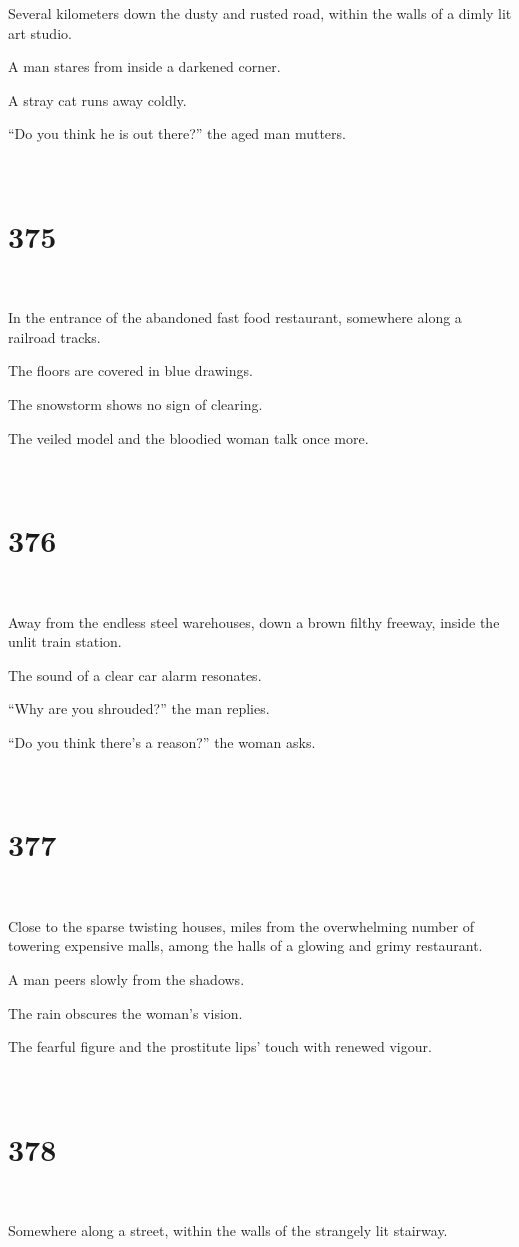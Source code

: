\documentclass{report}
\begin{document}
Several kilometers down the dusty and rusted road, within the walls of a dimly lit art studio.

A man stares from inside a darkened corner.

A stray cat runs away coldly.

``Do you think he is out there?'' the aged man mutters.

~
\chapter*{375}
~

In the entrance of the abandoned fast food restaurant, somewhere along a railroad tracks.

The floors are covered in blue drawings.

The snowstorm shows no sign of clearing.

The veiled model and the bloodied woman talk once more.

~
\chapter*{376}
~

Away from the endless steel warehouses, down a brown filthy freeway, inside the unlit train station.

The sound of a clear car alarm resonates.

``Why are you shrouded?'' the man replies.

``Do you think there's a reason?'' the woman asks.

~
\chapter*{377}
~

Close to the sparse twisting houses, miles from the overwhelming number of towering expensive malls, among the halls of a glowing and grimy restaurant.

A man peers slowly from the shadows.

The rain obscures the woman's vision.

The fearful figure and the prostitute lips' touch with renewed vigour.

~
\chapter*{378}
~

Somewhere along a street, within the walls of the strangely lit stairway.
\end{document}
